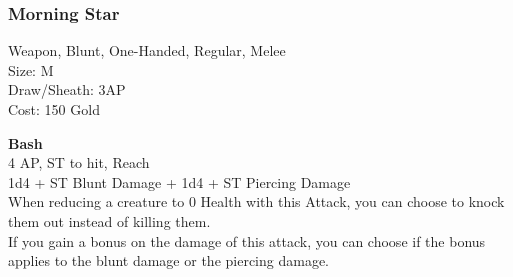 \subsubsection{Morning Star}\label{weapon:morningStar}
Weapon, Blunt, One-Handed, Regular, Melee\\
Size: M\\
Draw/Sheath: 3AP\\
Cost: 150 Gold

\textbf{Bash}\\
4 AP, ST to hit,  Reach\\
1d4 + \texttimes ST Blunt Damage + 1d4 + \texttimes ST Piercing Damage\\
When reducing a creature to 0 Health with this Attack, you can choose to knock them out instead of killing them.\\
If you gain a bonus on the damage of this attack, you can choose if the bonus applies to the blunt damage or the piercing damage.